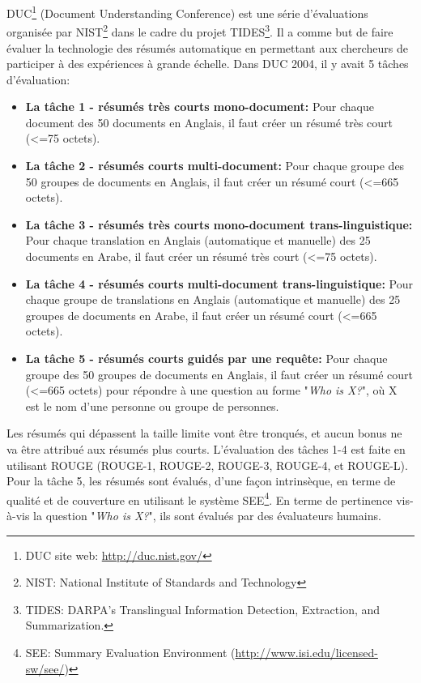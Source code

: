 \documentclass[a4paper,12pt,oneside]{../use/ESIthesis}
\begin{document}
DUC\footnote{DUC site web: \url{http://duc.nist.gov/}} (Document Understanding Conference) est une série d'évaluations organisée par NIST\footnote{NIST: National Institute of Standards and Technology} dans le cadre du projet TIDES\footnote{TIDES: DARPA's Translingual Information Detection, Extraction, and Summarization.}. 
Il a comme but de faire évaluer la technologie des résumés automatique en permettant aux chercheurs de participer à des expériences à grande échelle. 
Dans DUC 2004, il y avait 5 tâches d'évaluation:
\begin{itemize}

\item \textbf{La tâche 1 - résumés très courts mono-document:} Pour chaque document des 50 documents en Anglais, il faut créer un résumé très court (<=75 octets).

\item \textbf{La tâche 2 - résumés courts multi-document:} Pour chaque groupe des 50 groupes de documents en Anglais, il faut créer un résumé court (<=665 octets).

\item \textbf{La tâche 3 - résumés très courts mono-document trans-linguistique:} Pour chaque translation en Anglais (automatique et manuelle) des 25 documents en Arabe, il faut créer un résumé très court (<=75 octets).

\item \textbf{La tâche 4 - résumés courts multi-document trans-linguistique:} Pour chaque groupe de translations en Anglais (automatique et manuelle) des 25 groupes de documents en Arabe, il faut créer un résumé court (<=665 octets).

\item \textbf{La tâche 5 - résumés courts guidés par une requête:} Pour chaque groupe des 50 groupes de documents en Anglais, il faut créer un résumé court (<=665 octets) pour répondre à une question au forme "\textit{Who is X?}", où X est le nom d'une personne ou groupe de personnes.

\end{itemize}
Les résumés qui dépassent la taille limite vont être tronqués, et aucun bonus ne va être attribué aux résumés plus courts. 
L'évaluation des tâches 1-4 est faite en utilisant ROUGE (ROUGE-1, ROUGE-2, ROUGE-3, ROUGE-4, et ROUGE-L). 
Pour la tâche 5, les résumés sont évalués, d'une façon intrinsèque, en terme de qualité et de couverture en utilisant le système SEE\footnote{SEE: Summary Evaluation Environment (\url{http://www.isi.edu/licensed-sw/see/})}. 
En terme de pertinence vis-à-vis la question "\textit{Who is X?}", ils sont évalués par des évaluateurs humains.
\end{document}
